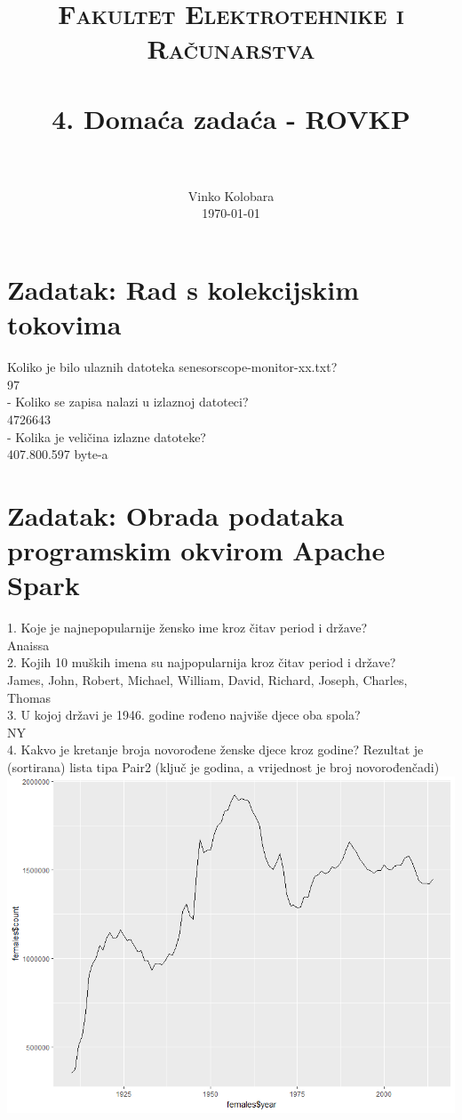 \documentclass[paper=a4, fontsize=11pt]{scrartcl}
\title{
		\usefont{OT1}{bch}{b}{n}
		\normalfont \normalsize \textsc{Fakultet Elektrotehnike i Računarstva} \\ [25pt]
		\horrule{0.5pt} \\[0.4cm]
		\huge 4. Domaća zadaća - ROVKP \\
		\horrule{2pt} \\[0.5cm]
}
\author{
		\normalfont 								\normalsize
        Vinko Kolobara\\[-3pt]		\normalsize
        \today
}
\date{}
\numberwithin{equation}{section}		%
\numberwithin{figure}{section}			%
\numberwithin{table}{section}				%
\begin{document}
\maketitle

\section{Zadatak: Rad s kolekcijskim tokovima}
Koliko je bilo ulaznih datoteka senesorscope-monitor-xx.txt?\\
97\\

- Koliko se zapisa nalazi u izlaznoj datoteci?\\
4726643\\

- Kolika je veličina izlazne datoteke?\\
407.800.597 byte-a\\


\pagebreak

\section{Zadatak: Obrada podataka programskim okvirom Apache Spark}
1. Koje je najnepopularnije žensko ime kroz čitav period i države?\\
Anaissa\\

2. Kojih 10 muških imena su najpopularnija kroz čitav period i države?\\
James, John, Robert, Michael, William, David, Richard, Joseph, Charles, Thomas\\

3. U kojoj državi je 1946. godine rođeno najviše djece oba spola?\\
NY\\

4. Kakvo je kretanje broja novorođene ženske djece kroz godine? Rezultat je (sortirana) lista tipa Pair2 (ključ
je godina, a vrijednost je broj novorođenčadi)\\

\includegraphics[width=\textwidth]{females.png}
\end{document}
